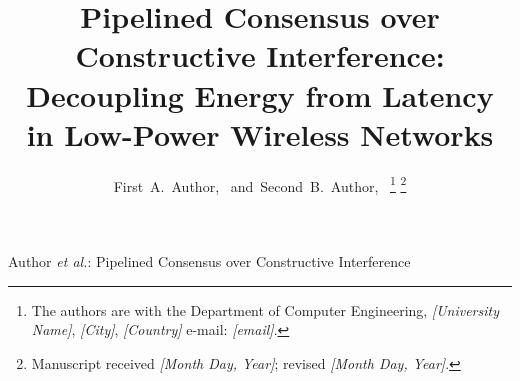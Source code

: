 \documentclass[journal]{IEEEtran}
\begin{document}
\title{Pipelined Consensus over Constructive Interference:\\
Decoupling Energy from Latency in Low-Power Wireless Networks}


\author{First~A.~Author,~
and~Second~B.~Author,~%
\thanks{The authors are with the Department of Computer Engineering,
\textit{[University Name]}, \textit{[City]}, \textit{[Country]}
e-mail: \textit{[email]}.}%
\thanks{Manuscript received \textit{[Month Day, Year]};
revised \textit{[Month Day, Year]}.}}


%
{Author \MakeLowercase{\textit{et al.}}: Pipelined Consensus over Constructive Interference}




\maketitle
\end{document}
